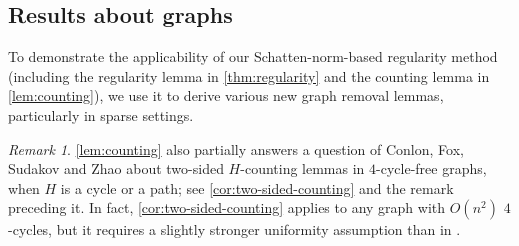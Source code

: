\documentclass[reqno,11pt]{amsart}
\theoremstyle{definition}
\theoremstyle{remark}
\newtheorem*{remark}{Remark}
\numberwithin{equation}{section}
\newcommand{\one}{\mathbbm{1}}
\begin{document}


\subsection{Results about graphs} 
To demonstrate the applicability of our Schatten-norm-based regularity method (including the regularity lemma in \cref{thm:regularity} and the counting lemma in \cref{lem:counting}), we use it to derive various new graph removal lemmas, particularly in sparse settings.

\begin{remark}
\cref{lem:counting} also partially answers a question of Conlon, Fox, Sudakov and Zhao \cite{conlon2021graphs} about two-sided $H$-counting lemmas in $4$-cycle-free graphs, when $H$ is a cycle or a path; see \cref{cor:two-sided-counting} and the remark preceding it. In fact, \cref{cor:two-sided-counting} applies to any graph with $O(n^2)$ $4$-cycles, but it requires a slightly stronger uniformity assumption than in \cite{conlon2021graphs}. %
\end{remark}
\end{document}
